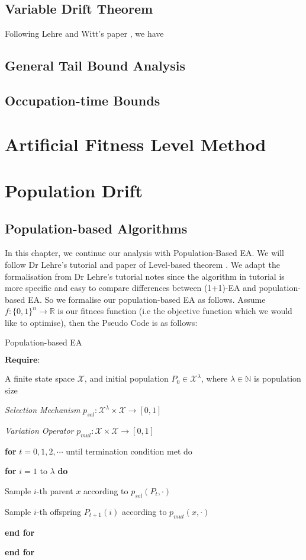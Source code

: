 \documentclass[a4paper,11pt]{report}
\theoremstyle{plain} %
\theoremstyle{definition} %
\theoremstyle{remark} %
\begin{document}
\subsection{Variable Drift Theorem}
Following Lehre and Witt's paper \citep{lehre_general_2018}, we have

\subsection{General Tail Bound Analysis}


\subsection{Occupation-time Bounds}


\section{Artificial Fitness Level Method}

\section{Population Drift}
\subsection{Population-based Algorithms}
\par In this chapter, we continue our analysis with Population-Based EA. We will follow Dr Lehre's tutorial \citep{Per2} and paper of Level-based theorem \citep{corus_level-based_2018}. We adapt the formalisation from Dr Lehre's tutorial notes since the algorithm in tutorial is more specific and easy to compare differences between (1+1)-EA and population-based EA. So we formalise our population-based EA as follows. Assume $f:\{0,1\}^n \rightarrow \mathbb{R}$ is our fitnees function (i.e the objective function which we would like to optimise), then the Pseudo Code is as follows:
\begin{algorithm}
\caption{Population-based EA}
$\mathbf{Require:}$ 

\quad A finite state space $\mathcal{X}$, and initial population  $P_{0}\in \mathcal{X}^{\lambda }$, where $\lambda \in \mathbb{N}$ is population size 

\quad \textit{Selection Mechanism} $p_{sel}:\mathcal{X}^{\lambda } \times \mathcal{X} \rightarrow [0,1]$

\quad \textit{Variation Operator} $p_{mul}:\mathcal{X} \times \mathcal{X} \rightarrow [0,1]$

\textbf{for} $t = 0, 1, 2, \cdots$ until termination condition met do

\quad \quad \textbf{for} $i=1$ to $\lambda$ \textbf{do}

 \quad \quad \quad Sample $i$-th parent $x$ according to $p_{sel}(P_{t},\cdot)$

\quad \quad \quad Sample $i$-th offspring $P_{t+1}(i)$ according to $p_{mut}(x,\cdot)$

\quad \quad \textbf{end for}

 \textbf{end for}
\end{algorithm}
\end{document}
